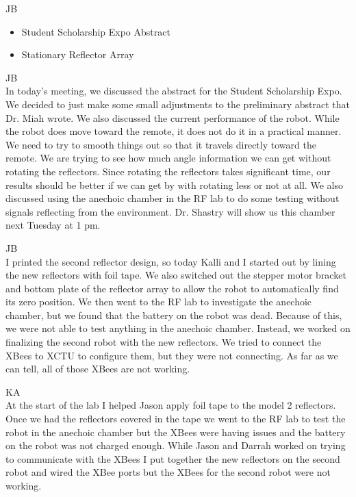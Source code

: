 \documentclass[fontsize=11pt, %
                             paper=letter, %
                             openany, %
                             captions=tableheading,
                             index=totoc,
                             hyperref]{labbook}
\begin{document}
\begin{addmargin}[0cm]{0cm}
JB\\
\begin{itemize}
    \item Student Scholarship Expo Abstract
    \item Stationary Reflector Array
\end{itemize}

JB\\
In today's meeting, we discussed the abstract for the Student Scholarship Expo. We decided to just make some small adjustments to the preliminary abstract that Dr. Miah wrote. We also discussed the current performance of the robot. While the robot does move toward the remote, it does not do it in a practical manner. We need to try to smooth things out so that it travels directly toward the remote. We are trying to see how much angle information we can get without rotating the reflectors. Since rotating the reflectors takes significant time, our results should be better if we can get by with rotating less or not at all. We also discussed using the anechoic chamber in the RF lab to do some testing without signals reflecting from the environment. Dr. Shastry will show us this chamber next Tuesday at 1 pm.

JB\\
I printed the second reflector design, so today Kalli and I started out by lining the new reflectors with foil tape. We also switched out the stepper motor bracket and bottom plate of the reflector array to allow the robot to automatically find its zero position. We then went to the RF lab to investigate the anechoic chamber, but we found that the battery on the robot was dead. Because of this, we were not able to test anything in the anechoic chamber. Instead, we worked on finalizing the second robot with the new reflectors. We tried to connect the XBees to XCTU to configure them, but they were not connecting. As far as we can tell, all of those XBees are not working.

\vspace*{12pt}
KA\\
At the start of the lab I helped Jason apply foil tape to the model 2 reflectors. Once we had the reflectors covered in the tape we went to the RF lab to test the robot in the anechoic chamber but the XBees were having issues and the battery on the robot was not charged enough. While Jason and Darrah worked on trying to communicate with the XBees I put together the new reflectors on the second robot and wired the XBee ports but the XBees for the second robot were not working.


\end{addmargin}
\end{document}
